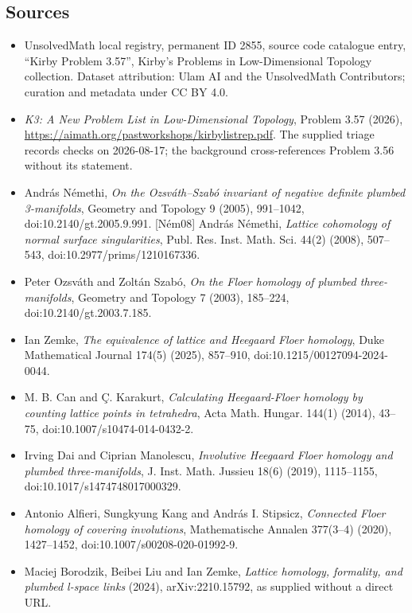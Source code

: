 \documentclass[11pt]{article}
\begin{document}
\subsection{Sources}
\begin{itemize}
\item UnsolvedMath local registry, permanent ID 2855, source code catalogue entry, ``Kirby Problem 3.57'', Kirby's Problems in Low-Dimensional Topology collection. Dataset attribution: Ulam AI and the UnsolvedMath Contributors; curation and metadata under CC BY 4.0.
\item \emph{K3: A New Problem List in Low-Dimensional Topology}, Problem 3.57 (2026), \url{https://aimath.org/pastworkshops/kirbylistrep.pdf}. The supplied triage records checks on 2026-08-17; the background cross-references Problem 3.56 without its statement.
\item [Ném05] András Némethi, \emph{On the Ozsváth--Szabó invariant of negative definite plumbed 3-manifolds}, Geometry and Topology 9 (2005), 991--1042, doi:10.2140/gt.2005.9.991. [Ném08] András Némethi, \emph{Lattice cohomology of normal surface singularities}, Publ. Res. Inst. Math. Sci. 44(2) (2008), 507--543, doi:10.2977/prims/1210167336.
\item [OS03b] Peter Ozsváth and Zoltán Szabó, \emph{On the Floer homology of plumbed three-manifolds}, Geometry and Topology 7 (2003), 185--224, doi:10.2140/gt.2003.7.185.
\item [Zem25] Ian Zemke, \emph{The equivalence of lattice and Heegaard Floer homology}, Duke Mathematical Journal 174(5) (2025), 857--910, doi:10.1215/00127094-2024-0044.
\item [CK14] M. B. Can and Ç. Karakurt, \emph{Calculating Heegaard-Floer homology by counting lattice points in tetrahedra}, Acta Math. Hungar. 144(1) (2014), 43--75, doi:10.1007/s10474-014-0432-2.
\item [DM19] Irving Dai and Ciprian Manolescu, \emph{Involutive Heegaard Floer homology and plumbed three-manifolds}, J. Inst. Math. Jussieu 18(6) (2019), 1115--1155, doi:10.1017/s1474748017000329.
\item [AKS20] Antonio Alfieri, Sungkyung Kang and András I. Stipsicz, \emph{Connected Floer homology of covering involutions}, Mathematische Annalen 377(3--4) (2020), 1427--1452, doi:10.1007/s00208-020-01992-9.
\item [BLZ24] Maciej Borodzik, Beibei Liu and Ian Zemke, \emph{Lattice homology, formality, and plumbed l-space links} (2024), arXiv:2210.15792, as supplied without a direct URL.

\end{itemize}
\end{document}
